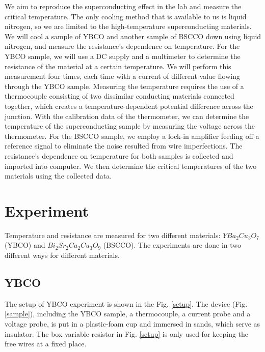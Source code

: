 \documentclass[prb,preprint]{revtex4-1}
\begin{document}
We aim to reproduce the superconducting effect in the lab and measure the critical temperature. The only cooling method that is available to us is liquid nitrogen, so we are limited to the high-temperature superconducting materials. We will cool a sample of YBCO and another sample of BSCCO down using liquid nitrogen, and measure the resistance's dependence on temperature. For the YBCO sample, we will use a DC supply and a multimeter to determine the resistance of the material at a certain temperature. We will perform this measurement four times, each time with a current of different value flowing through the YBCO sample. Measuring the temperature requires the use of a thermocouple consisting of two dissimilar conducting materials connected together, which creates a temperature-dependent potential difference across the junction. With the calibration data of the thermometer, we can determine the temperature of the superconducting sample by measuring the voltage across the thermometer. For the BSCCO sample, we employ a lock-in amplifier feeding off a reference signal to eliminate the noise resulted from wire imperfections. The resistance's dependence on temperature for both samples is collected and imported into computer. We then determine the critical temperatures of the two materials using the collected data.\\


\section{Experiment}
Temperature and resistance are measured for two different materials: $YBa_{2}Cu_{3}O_{7}$ (YBCO) and $Bi_{2}Sr_{2}Ca_{2}Cu_{3}O_{9}$ (BSCCO). The experiments are done in two different ways for different materials.\\
\subsection{YBCO}
The setup of YBCO experiment is shown in the Fig. \ref{setup}. The device (Fig. \ref{sample}), including the YBCO sample, a thermocouple, a current probe and a voltage probe, is put in a plastic-foam cup and immersed in sands, which serve as insulator. The box variable resistor in Fig. \ref{setup} is only used for keeping the free wires at a fixed place. \\
\end{document}
